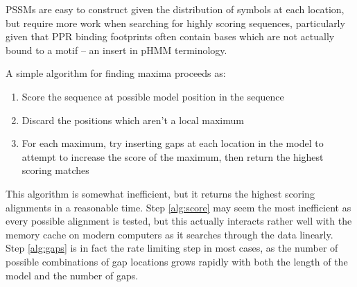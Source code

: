PSSMs are easy to construct given the distribution of symbols at each location,
but require more work when searching for highly scoring sequences, particularly
given that PPR binding footprints often contain bases which are not actually
bound to a motif -- an insert in pHMM terminology.

A simple algorithm for finding maxima proceeds as:
\begin{enumerate}
  \item \label{alg:score} 
    Score the sequence at possible model position in the sequence
  \item \label{alg:nms}
    Discard the positions which aren't a local maximum
  \item \label{alg:gaps}
    For each maximum, try inserting gaps at each location in the model to
    attempt to increase the score of the maximum, then return the highest
    scoring matches
\end{enumerate}
This algorithm is somewhat inefficient, but it returns the highest scoring
alignments in a reasonable time.
Step \ref{alg:score} may seem the most inefficient as every possible alignment
is tested, but this actually interacts rather well with the memory cache on
modern computers as it searches through the data linearly.
Step \ref{alg:gaps} is in fact the rate limiting step in most cases, as the
number of possible combinations of gap locations grows rapidly with both the
length of the model and the number of gaps.

